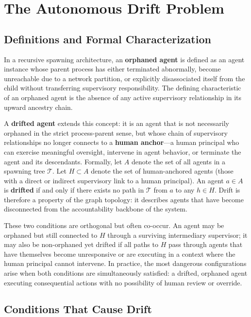 \section{The Autonomous Drift Problem}

\subsection{Definitions and Formal Characterization}

In a recursive spawning architecture, an \textbf{orphaned agent} is defined as an agent instance whose parent process has either terminated abnormally, become unreachable due to a network partition, or explicitly disassociated itself from the child without transferring supervisory responsibility. The defining characteristic of an orphaned agent is the absence of any active supervisory relationship in its upward ancestry chain.

A \textbf{drifted agent} extends this concept: it is an agent that is not necessarily orphaned in the strict process-parent sense, but whose chain of supervisory relationships no longer connects to a \textbf{human anchor}---a human principal who can exercise meaningful oversight, intervene in agent behavior, or terminate the agent and its descendants. Formally, let $A$ denote the set of all agents in a spawning tree $\mathcal{T}$. Let $H \subset A$ denote the set of human-anchored agents (those with a direct or indirect supervisory link to a human principal). An agent $a \in A$ is \textbf{drifted} if and only if there exists no path in $\mathcal{T}$ from $a$ to any $h \in H$. Drift is therefore a property of the graph topology: it describes agents that have become disconnected from the accountability backbone of the system.

These two conditions are orthogonal but often co-occur. An agent may be orphaned but still connected to $H$ through a surviving intermediary supervisor; it may also be non-orphaned yet drifted if all paths to $H$ pass through agents that have themselves become unresponsive or are executing in a context where the human principal cannot intervene. In practice, the most dangerous configurations arise when both conditions are simultaneously satisfied: a drifted, orphaned agent executing consequential actions with no possibility of human review or override.

\subsection{Conditions That Cause Drift}


